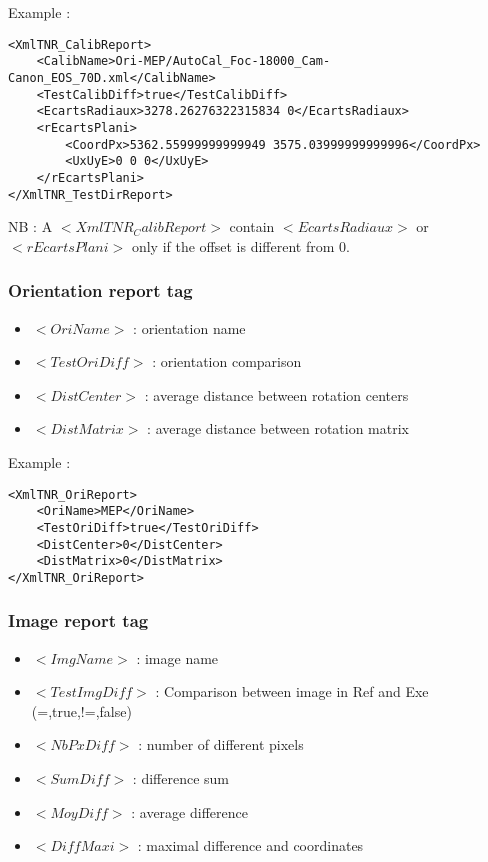 \documentclass[a4paper]{book}
\begin{document}
Example :
\begin{lstlisting}
<XmlTNR_CalibReport>
	<CalibName>Ori-MEP/AutoCal_Foc-18000_Cam-Canon_EOS_70D.xml</CalibName>
	<TestCalibDiff>true</TestCalibDiff>
	<EcartsRadiaux>3278.26276322315834 0</EcartsRadiaux>
	<rEcartsPlani>
		<CoordPx>5362.55999999999949 3575.03999999999996</CoordPx>
		<UxUyE>0 0 0</UxUyE>
	</rEcartsPlani>
</XmlTNR_TestDirReport>
\end{lstlisting}

NB : A $<XmlTNR_CalibReport>$ contain $<EcartsRadiaux>$ or $<rEcartsPlani>$ only if the offset is different from 0.

\subsubsection{Orientation report tag}
\begin{itemize}
\item $<OriName>$ : orientation name
\item $<TestOriDiff>$ : orientation comparison
\item $<DistCenter>$ : average distance between rotation centers
\item $<DistMatrix>$ : average distance between rotation matrix\\
\end{itemize}

Example : 
\begin{lstlisting}
<XmlTNR_OriReport>
	<OriName>MEP</OriName>
	<TestOriDiff>true</TestOriDiff>
	<DistCenter>0</DistCenter>
	<DistMatrix>0</DistMatrix>
</XmlTNR_OriReport>
\end{lstlisting}

\subsubsection{Image report tag}
\begin{itemize}
\item $<ImgName>$ : image name
\item $<TestImgDiff>$ : Comparison between image in Ref and Exe (=,true,!=,false)
\item $<NbPxDiff>$ : number of different pixels
\item $<SumDiff>$ : difference sum
\item $<MoyDiff>$ : average difference
\item $<DiffMaxi>$ : maximal difference and coordinates
\end{itemize}
\end{document}
